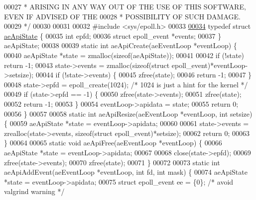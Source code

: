 \begin{DoxyCode}
00027 \textcolor{comment}{ * ARISING IN ANY WAY OUT OF THE USE OF THIS SOFTWARE, EVEN IF ADVISED OF THE}
00028 \textcolor{comment}{ * POSSIBILITY OF SUCH DAMAGE.}
00029 \textcolor{comment}{ */}
00030 
00031 
00032 \textcolor{preprocessor}{#}\textcolor{preprocessor}{include} \textcolor{preprocessor}{<}\textcolor{preprocessor}{sys}\textcolor{preprocessor}{/}\textcolor{preprocessor}{epoll}\textcolor{preprocessor}{.}\textcolor{preprocessor}{h}\textcolor{preprocessor}{>}
00033 
\hyperlink{structaeApiState}{00034} \textcolor{keyword}{typedef} \textcolor{keyword}{struct} \hyperlink{structaeApiState}{aeApiState} \{
00035     \textcolor{keywordtype}{int} epfd;
00036     \textcolor{keyword}{struct} epoll\_event *events;
00037 \} aeApiState;
00038 
00039 \textcolor{keyword}{static} \textcolor{keywordtype}{int} aeApiCreate(aeEventLoop *eventLoop) \{
00040     aeApiState *state = zmalloc(\textcolor{keyword}{sizeof}(aeApiState));
00041 
00042     \textcolor{keywordflow}{if} (!state) \textcolor{keywordflow}{return} -1;
00043     state->events = zmalloc(\textcolor{keyword}{sizeof}(\textcolor{keyword}{struct} epoll\_event)*eventLoop->setsize);
00044     \textcolor{keywordflow}{if} (!state->events) \{
00045         zfree(state);
00046         \textcolor{keywordflow}{return} -1;
00047     \}
00048     state->epfd = epoll\_create(1024); \textcolor{comment}{/* 1024 is just a hint for the kernel */}
00049     \textcolor{keywordflow}{if} (state->epfd == -1) \{
00050         zfree(state->events);
00051         zfree(state);
00052         \textcolor{keywordflow}{return} -1;
00053     \}
00054     eventLoop->apidata = state;
00055     \textcolor{keywordflow}{return} 0;
00056 \}
00057 
00058 \textcolor{keyword}{static} \textcolor{keywordtype}{int} aeApiResize(aeEventLoop *eventLoop, \textcolor{keywordtype}{int} setsize) \{
00059     aeApiState *state = eventLoop->apidata;
00060 
00061     state->events = zrealloc(state->events, \textcolor{keyword}{sizeof}(\textcolor{keyword}{struct} epoll\_event)*setsize);
00062     \textcolor{keywordflow}{return} 0;
00063 \}
00064 
00065 \textcolor{keyword}{static} \textcolor{keywordtype}{void} aeApiFree(aeEventLoop *eventLoop) \{
00066     aeApiState *state = eventLoop->apidata;
00067 
00068     close(state->epfd);
00069     zfree(state->events);
00070     zfree(state);
00071 \}
00072 
00073 \textcolor{keyword}{static} \textcolor{keywordtype}{int} aeApiAddEvent(aeEventLoop *eventLoop, \textcolor{keywordtype}{int} fd, \textcolor{keywordtype}{int} mask) \{
00074     aeApiState *state = eventLoop->apidata;
00075     \textcolor{keyword}{struct} epoll\_event ee = \{0\}; \textcolor{comment}{/* avoid valgrind warning */}

\end{DoxyCode}
